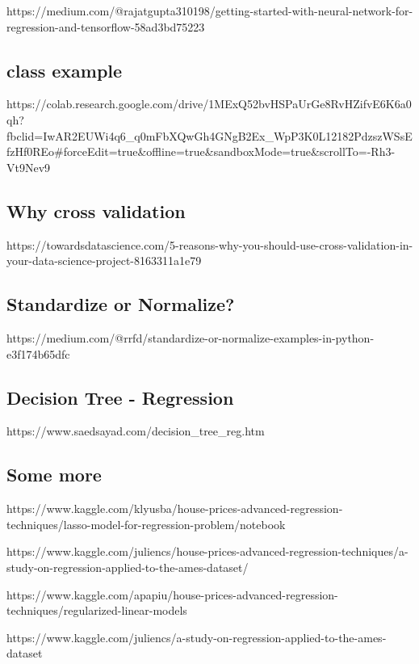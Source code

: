 \documentclass[11pt, a4paper , landscape]{article}
\begin{document}
https://medium.com/@rajatgupta310198/getting-started-with-neural-network-for-regression-and-tensorflow-58ad3bd75223

\subsection{class example}\label{class-example}

https://colab.research.google.com/drive/1MExQ52bvHSPaUrGe8RvHZifvE6K6a0qh?fbclid=IwAR2EUWi4q6\_q0mFbXQwGh4GNgB2Ex\_WpP3K0L12182PdzszWSsEfzHf0REo\#forceEdit=true\&offline=true\&sandboxMode=true\&scrollTo=-Rh3-Vt9Nev9

\subsection{Why cross validation}\label{why-cross-validation}

https://towardsdatascience.com/5-reasons-why-you-should-use-cross-validation-in-your-data-science-project-8163311a1e79

\subsection{Standardize or Normalize? }\label{standardize-or-normalize}

https://medium.com/@rrfd/standardize-or-normalize-examples-in-python-e3f174b65dfc

\subsection{Decision Tree -
Regression}\label{decision-tree---regression}

https://www.saedsayad.com/decision\_tree\_reg.htm

\subsection{Some more}\label{some-more}

https://www.kaggle.com/klyusba/house-prices-advanced-regression-techniques/lasso-model-for-regression-problem/notebook

https://www.kaggle.com/juliencs/house-prices-advanced-regression-techniques/a-study-on-regression-applied-to-the-ames-dataset/

https://www.kaggle.com/apapiu/house-prices-advanced-regression-techniques/regularized-linear-models

https://www.kaggle.com/juliencs/a-study-on-regression-applied-to-the-ames-dataset
\end{document}
